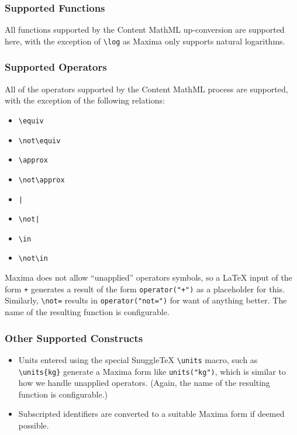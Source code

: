\subsubsection*{Supported Functions}

All functions supported by the Content MathML up-conversion are supported
here, with the exception of \verb|\log| as Maxima only supports natural
logarithms.

\subsubsection*{Supported Operators}

All of the operators supported by the Content MathML process are
supported, with the exception of the following relations:

\begin{itemize}
  \item \verb|\equiv|
  \item \verb|\not\equiv|
  \item \verb|\approx|
  \item \verb|\not\approx|
  \item \verb.|.
  \item \verb.\not|.
  \item \verb|\in|
  \item \verb|\not\in|
\end{itemize}

Maxima does not allow ``unapplied'' operators symbols, so a LaTeX input
of the form \verb|+| generates a result of the form \verb|operator("+")|
as a placeholder for this. Similarly, \verb|\not=| results in
\verb|operator("not=")| for want of anything better.
The name of the resulting function is configurable.

\subsubsection*{Other Supported Constructs}

\begin{itemize}
\item
  Units entered using the special SnuggleTeX \verb|\units| macro, such as
  \verb|\units{kg}| generate a Maxima form like \verb|units("kg")|, which
  is similar to how we handle unapplied operators. (Again, the name of
  the resulting function is configurable.)

\item
  Subscripted identifiers are converted to a suitable Maxima form if
  deemed possible.
\end{itemize}
